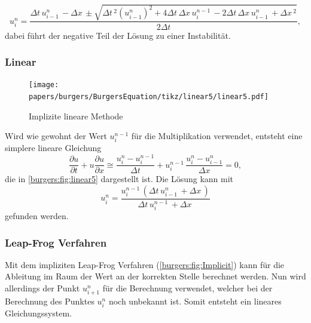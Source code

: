 	\begin{equation}
	  u_{i}^{n} =
	     \dfrac{\Delta{t}\, u^{n}_{i-1}\, - \Delta{x}\, \pm \sqrt{\Delta{t}\,^{2} (u^{n}_{i-1})^{2} + 4 \Delta{t}\, \Delta{x}\, u^{n-1}_{i}\, - 2 \Delta{t}\, \Delta{x}\, u^{n}_{i-1}\, + \Delta{x}\,^{2}}}{2 \Delta{t}},
	\end{equation}
	dabei f\"uhrt der negative Teil der L\"osung zu einer Instabilität.


	\subsubsection{Linear}
	\label{burgers:sec:imp_lin}
	     \begin{figure}
		\centering
		\texttt{[image: papers/burgers/BurgersEquation/tikz/linear5/linear5.pdf]}
		\caption{Implizite lineare Methode}
		\label{burgers:fig:linear5}
		\end{figure}

		Wird wie gewohnt der Wert  $u_{i}^{n-1}$ f\"ur die Multiplikation verwendet, entsteht eine simplere lineare Gleichung
	    \begin{equation}
		\frac {\partial u}{\partial t}+u{\frac {\partial u}{\partial x}} \cong \frac{u_{i}^{n}-u_{i}^{n-1}}{\Delta t}+ u_{i}^{n-1}\, \frac{u_{i}^{n}-u_{i-1}^{n}}{\Delta x}=0,
		\label{burgers:eq:imp_lin}
		\end{equation}
		die in \autoref{burgers:fig:linear5} dargestellt ist.
	    Die L\"osung kann mit
	    \begin{equation}
		 u_{i}^{n} = \frac{u^{n-1}_{i}\, \left(\Delta{t}\, u^{n}_{i-1}\, + \Delta{x}\,\right)}{\Delta{t}\, u^{n-1}_{i}\, + \Delta{x}\,}
		 \label{burgers:eq:imp_lin_sol}
		\end{equation}
	    gefunden werden.

	\subsubsection{Leap-Frog Verfahren}

		Mit dem impliziten Leap-Frog Verfahren (\autoref{burgers:fig:Implicit}) kann f\"ur die Ableitung im Raum der Wert an der korrekten Stelle berechnet werden.
		Nun wird allerdings der Punkt  $u_{i+1}^{n}$ f\"ur die Berechnung verwendet, welcher bei der Berechnung des Punktes  $u_{i}^{n}$ noch unbekannt ist.
		Somit entsteht ein lineares Gleichungssystem.

